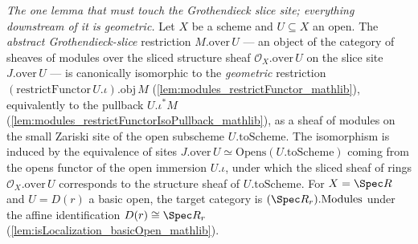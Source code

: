 \begin{lemma}
  \label{lem:over_restrict_iso}
  \textit{The one lemma that must touch the Grothendieck slice site; everything downstream of it is
  geometric.}
  Let \(X\) be a scheme and \(U \subseteq X\) an open. The \emph{abstract Grothendieck-slice}
  restriction \(M.\mathrm{over}\,U\) — an object of the category of sheaves of modules over the
  sliced structure sheaf \(\mathcal{O}_X.\mathrm{over}\,U\) on the slice site \(J.\mathrm{over}\,U\) —
  is canonically isomorphic to the \emph{geometric} restriction
  \((\mathrm{restrictFunctor}\,U.\iota).\mathrm{obj}\,M\)
  (\cref{lem:modules_restrictFunctor_mathlib}), equivalently to the pullback \(U.\iota^{*} M\)
  (\cref{lem:modules_restrictFunctorIsoPullback_mathlib}), as a sheaf of modules on the small Zariski
  site of the open subscheme \(U.\mathrm{toScheme}\). The isomorphism is induced by the equivalence
  of sites \(J.\mathrm{over}\,U \simeq \mathrm{Opens}(U.\mathrm{toScheme})\) coming from the opens
  functor of the open immersion \(U.\iota\), under which the sliced sheaf of rings
  \(\mathcal{O}_X.\mathrm{over}\,U\) corresponds to the structure sheaf of \(U.\mathrm{toScheme}\).
  For \(X = \Spec R\) and \(U = D(r)\) a basic open, the target category is
  \((\Spec R_r).\mathrm{Modules}\) under the affine identification \(D(r) \cong \Spec R_r\)
  (\cref{lem:isLocalization_basicOpen_mathlib}).
\end{lemma}
